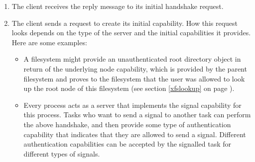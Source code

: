 \begin{enumerate}
\begin{comment}
  This means however, that the server needs to be careful in not
  consuming too many resources for this service.  However, this is
  easy to achieve.  Only one task info cap per client task will ever
  be held in the server.  The server can either keep it around until
  the task dies (and a task death notification is received), or it can
  clean it up after some timeout if the client does not follow up and
  do some real authentication.
\end{comment}

\item The client receives the reply message to its initial handshake
  request.
  
\item The client sends a request to create its initial capability.
  How this request looks depends on the type of the server and the
  initial capabilities it provides.  Here are some examples:

  \begin{itemize}
  \item A filesystem might provide an unauthenticated root directory
    object in return of the underlying node capability, which is
    provided by the parent filesystem and proves to the filesystem
    that the user was allowed to look up the root node of this
    filesystem (see section \ref{xfslookup} on page
    \pageref{xfslookup}).

    \begin{comment}
      In this example, the parent filesystem will either provide the
      task info cap for the child filesystem to the user, or it will
      hold the task info cap while the user is creating their own
      (which the user has to verify by repeating the lookup, though).
      Again, see section \ref{xfslookup} on page \pageref{xfslookup}.
      
      The unauthenticated root directory object will then have the be
      authenticated using the normal reauthentication mechanism (see
      section \ref{auth} on pageref{auth}).  This can also be combined
      in a single RPC.
    \end{comment}
    
  \item Every process acts as a server that implements the signal
    capability for this process.  Tasks who want to send a signal to
    another task can perform the above handshake, and then provide
    some type of authentication capability that indicates that they
    are allowed to send a signal.  Different authentication
    capabilities can be accepted by the signalled task for different
    types of signals.


\end{itemize}
\end{enumerate}
